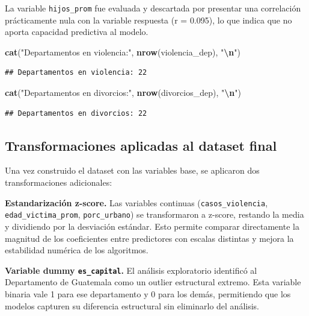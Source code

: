 \documentclass[
]{article}
\newenvironment{Shaded}{\begin{snugshade}}{\end{snugshade}}
\newcommand{\FunctionTok}[1]{\textcolor[rgb]{0.13,0.29,0.53}{\textbf{#1}}}
\newcommand{\NormalTok}[1]{#1}
\newcommand{\SpecialCharTok}[1]{\textcolor[rgb]{0.81,0.36,0.00}{\textbf{#1}}}
\newcommand{\StringTok}[1]{\textcolor[rgb]{0.31,0.60,0.02}{#1}}
\begin{document}
La variable \texttt{hijos\_prom} fue evaluada y descartada por presentar
una correlación prácticamente nula con la variable respuesta (r =
0.095), lo que indica que no aporta capacidad predictiva al modelo.

\begin{Shaded}
\begin{Highlighting}[]
\FunctionTok{cat}\NormalTok{(}\StringTok{"Departamentos en violencia:"}\NormalTok{, }\FunctionTok{nrow}\NormalTok{(violencia\_dep), }\StringTok{"}\SpecialCharTok{\textbackslash{}n}\StringTok{"}\NormalTok{)}
\end{Highlighting}
\end{Shaded}

\begin{verbatim}
## Departamentos en violencia: 22
\end{verbatim}

\begin{Shaded}
\begin{Highlighting}[]
\FunctionTok{cat}\NormalTok{(}\StringTok{"Departamentos en divorcios:"}\NormalTok{, }\FunctionTok{nrow}\NormalTok{(divorcios\_dep), }\StringTok{"}\SpecialCharTok{\textbackslash{}n}\StringTok{"}\NormalTok{)}
\end{Highlighting}
\end{Shaded}

\begin{verbatim}
## Departamentos en divorcios: 22
\end{verbatim}

\hypertarget{transformaciones-aplicadas-al-dataset-final}{%
\subsection{Transformaciones aplicadas al dataset
final}\label{transformaciones-aplicadas-al-dataset-final}}

Una vez construido el dataset con las variables base, se aplicaron dos
transformaciones adicionales:

\textbf{Estandarización z-score.} Las variables continuas
(\texttt{casos\_violencia}, \texttt{edad\_victima\_prom},
\texttt{porc\_urbano}) se transformaron a z-score, restando la media y
dividiendo por la desviación estándar. Esto permite comparar
directamente la magnitud de los coeficientes entre predictores con
escalas distintas y mejora la estabilidad numérica de los algoritmos.

\textbf{Variable dummy \texttt{es\_capital}.} El análisis exploratorio
identificó al Departamento de Guatemala como un outlier estructural
extremo. Esta variable binaria vale 1 para ese departamento y 0 para los
demás, permitiendo que los modelos capturen su diferencia estructural
sin eliminarlo del análisis.
\end{document}
